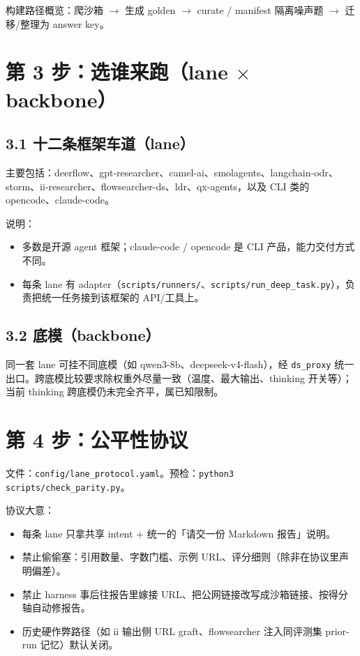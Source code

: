 \documentclass[11pt,a4paper]{article}
\begin{document}
构建路径概览：爬沙箱 $\rightarrow$ 生成 golden $\rightarrow$ curate / manifest 隔离噪声题 $\rightarrow$ 迁移/整理为 answer key。

\section{第 3 步：选谁来跑（lane $\times$ backbone）}

\subsection{3.1 十二条框架车道（lane）}

主要包括：deerflow、gpt-researcher、camel-ai、smolagents、langchain-odr、storm、ii-researcher、flowsearcher-ds、ldr、qx-agents，以及 CLI 类的 opencode、claude-code。

说明：
\begin{itemize}[leftmargin=1.5em]
  \item 多数是开源 agent 框架；claude-code / opencode 是 CLI 产品，能力交付方式不同。
  \item 每条 lane 有 adapter（\texttt{scripts/runners/}、\texttt{scripts/run\_deep\_task.py}），负责把统一任务接到该框架的 API/工具上。
\end{itemize}

\subsection{3.2 底模（backbone）}

同一套 lane 可挂不同底模（如 qwen3-8b、deepseek-v4-flash），经 \texttt{ds\_proxy} 统一出口。跨底模比较要求除权重外尽量一致（温度、最大输出、thinking 开关等）；当前 thinking 跨底模仍未完全齐平，属已知限制。

\section{第 4 步：公平性协议}

文件：\texttt{config/lane\_protocol.yaml}。预检：\texttt{python3 scripts/check\_parity.py}。

协议大意：
\begin{itemize}[leftmargin=1.5em]
  \item 每条 lane 只拿共享 intent + 统一的「请交一份 Markdown 报告」说明。
  \item 禁止偷偷塞：引用数量、字数门槛、示例 URL、评分细则（除非在协议里声明偏差）。
  \item 禁止 harness 事后往报告里嫁接 URL、把公网链接改写成沙箱链接、按得分轴自动修报告。
  \item 历史硬作弊路径（如 ii 输出侧 URL graft、flowsearcher 注入同评测集 prior-run 记忆）默认关闭。
\end{itemize}
\end{document}
